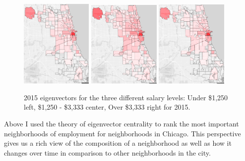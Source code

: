 \documentclass{article}
\theoremstyle{definition}
\theoremstyle{remark}
\begin{document}
\begin{figure}[H]
    \centering
    \includegraphics[width=0.31\textwidth]{Jobs-SE001-2015}
    \includegraphics[width=0.31\textwidth]{Jobs-SE002-2015}
    \includegraphics[width=0.31\textwidth]{Jobs-SE003-2015}
    \caption{2015 eigenvectors for the three different salary levels: Under \$1,250 left, \$1,250 - \$3,333 center, Over \$3,333 right for 2015.}
    \label{fig:Jobs-S000-2008}
\end{figure}

Above I used the theory of eigenvector centrality to rank the most important neighborhoods of employment for neighborhoods in Chicago.  This perspective gives us a rich view of the composition of a neighborhood as well as how it changes over time in comparison to other neighborhoods in the city.
\end{document}
